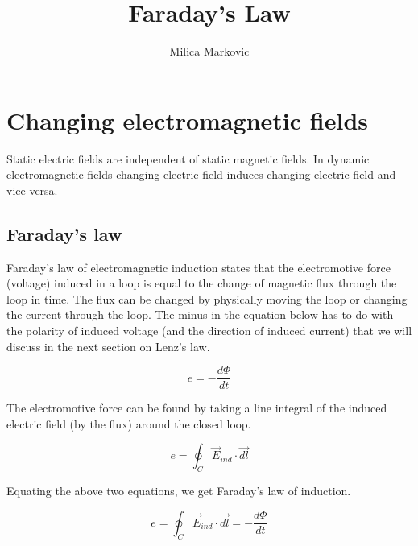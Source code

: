 \documentclass{ximera}
\title{Faraday's Law}
\author{Milica Markovic}
\begin{document}
  
\begin{abstract}  

\end{abstract}  
\maketitle    


\section{Changing electromagnetic fields}

 Static electric fields are independent of static magnetic fields. In dynamic electromagnetic fields changing electric field induces changing electric field and vice versa. 



\subsection{Faraday's law}

Faraday's law of electromagnetic induction states that the electromotive force (voltage) induced in a loop is equal to the change of magnetic flux through the loop in time. The flux can be changed by physically moving the loop or changing the current through the loop. The minus in the equation below has to do with the polarity of induced voltage (and the direction of induced current)  that we will discuss in the next section on Lenz's law.

\begin{equation}
e=-\frac{d\Phi}{dt}
\end{equation}

The electromotive force can be found by taking a line integral of the induced electric field (by the flux) around the closed loop.

\begin{equation}
e=\oint_C \vec{E}_{ind} \cdot \vec{dl}
\end{equation}


Equating the above two equations, we get Faraday's law of induction.


\begin{equation}
e=\oint_C \vec{E}_{ind} \cdot \vec{dl} =-\frac{d\Phi}{dt}
\end{equation}
\end{document}
